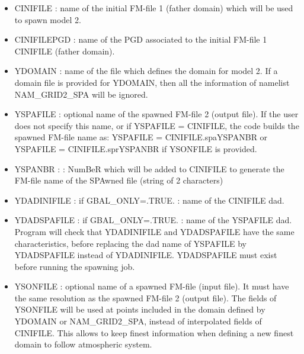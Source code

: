 \begin{itemize}
\item CINIFILE :
name of the initial FM-file 1 (father domain)
which will be used to spawn model 2.
\item CINIFILEPGD :
name of the PGD associated to the initial FM-file 1 CINIFILE (father domain).
\item YDOMAIN : 
name of the file which defines the domain for model 2. If a domain file is provided for YDOMAIN, then all the information of namelist NAM\_GRID2\_SPA will be ignored. 
\item YSPAFILE : optional name of the spawned FM-file 2 (output file).
If the user does not specify this name,
or if YSPAFILE = CINIFILE, the code builds the spawned FM-file name as:
\subitem YSPAFILE = CINIFILE.spaYSPANBR
\subitem or YSPAFILE = CINIFILE.sprYSPANBR if YSONFILE is provided.
\item YSPANBR :
 :
NumBeR which will be added to CINIFILE to generate the  
FM-file name of the SPAwned file (string of 2 characters)
\item YDADINIFILE : if GBAL\_ONLY=.TRUE. : name of the CINIFILE dad.
\item YDADSPAFILE : if GBAL\_ONLY=.TRUE. : name of the YSPAFILE dad. 
Program will check that YDADINIFILE and YDADSPAFILE have the same 
characteristics,
before replacing the dad name of YSPAFILE by YDADSPAFILE instead of YDADINIFILE.
YDADSPAFILE must exist before running the spawning job. 
\item YSONFILE : optional name of a spawned FM-file (input file). 
It must have the same resolution as the spawned FM-file 2 (output file).
The fields of YSONFILE will be used at points included in the domain
defined by YDOMAIN or NAM\_GRID2\_SPA, instead of interpolated fields
 of CINIFILE.
This allows to keep finest information when defining a new finest domain to
follow atmospheric system.
\end{itemize} 

